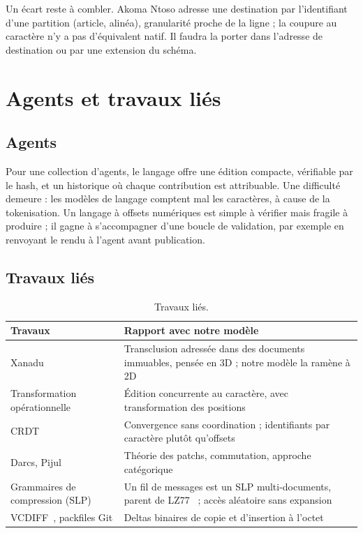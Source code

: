 \documentclass[11pt,a4paper]{article}
\begin{document}
Un écart reste à combler. Akoma Ntoso adresse une destination par l'identifiant d'une partition (article, alinéa), granularité proche de la ligne ; la coupure au caractère n'y a pas d'équivalent natif. Il faudra la porter dans l'adresse de destination ou par une extension du schéma.

\section{Agents et travaux liés}

\subsection{Agents}

Pour une collection d'agents, le langage offre une édition compacte, vérifiable par le hash, et un historique où chaque contribution est attribuable. Une difficulté demeure : les modèles de langage comptent mal les caractères, à cause de la tokenisation. Un langage à offsets numériques est simple à vérifier mais fragile à produire ; il gagne à s'accompagner d'une boucle de validation, par exemple en renvoyant le rendu à l'agent avant publication.

\subsection{Travaux liés}

\begin{table}[H]
\centering
\begin{tabularx}{\linewidth}{@{}lL@{}}
\toprule
Travaux & Rapport avec notre modèle \\
\midrule
Xanadu~\cite{nelson1981} & Transclusion adressée dans des documents immuables, pensée en 3D ; notre modèle la ramène à 2D \\
Transformation opérationnelle~\cite{ellis1989} & Édition concurrente au caractère, avec transformation des positions \\
CRDT~\cite{shapiro2011} & Convergence sans coordination ; identifiants par caractère plutôt qu'offsets \\
Darcs, Pijul~\cite{mimram2013} & Théorie des patchs, commutation, approche catégorique \\
Grammaires de compression (SLP) & Un fil de messages est un SLP multi-documents, parent de LZ77~\cite{ziv1977} ; accès aléatoire sans expansion~\cite{bille2011,lohrey2012} \\
VCDIFF~\cite{rfc3284}, packfiles Git & Deltas binaires de copie et d'insertion à l'octet \\
\bottomrule
\end{tabularx}
\caption{Travaux liés.}
\end{table}
\end{document}
